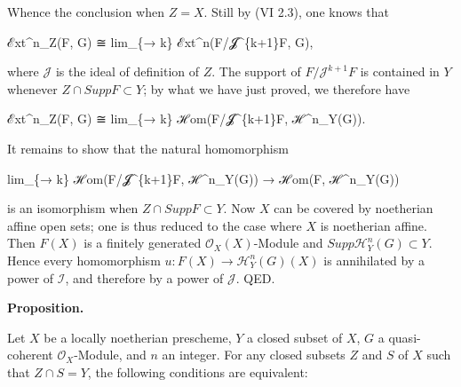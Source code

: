 \documentclass[
  11pt,
  a4paper,
]{book}
\newenvironment{Shaded}{}{}
\newcommand{\NormalTok}[1]{#1}
\begin{document}
Whence the conclusion when \(Z = X\). Still by (VI 2.3), one knows that

\begin{Shaded}
\begin{Highlighting}[]
\NormalTok{ℰxt\^{}n\_Z(F, G) ≅ lim\_\{→ k\} ℰxt\^{}n(F/𝓙\^{}\{k+1\}F, G),}
\end{Highlighting}
\end{Shaded}

where \(\mathcal{J}\) is the ideal of definition of \(Z\). The support
of \(F/\mathcal{J}^{k+1}F\) is contained in \(Y\) whenever
\(Z \cap Supp F \subset Y\); by what we have just proved, we therefore
have

\begin{Shaded}
\begin{Highlighting}[]
\NormalTok{ℰxt\^{}n\_Z(F, G) ≅ lim\_\{→ k\} ℋom(F/𝓙\^{}\{k+1\}F, ℋ\^{}n\_Y(G)).}
\end{Highlighting}
\end{Shaded}

It remains to show that the natural homomorphism

\begin{Shaded}
\begin{Highlighting}[]
\NormalTok{lim\_\{→ k\} ℋom(F/𝓙\^{}\{k+1\}F, ℋ\^{}n\_Y(G)) → ℋom(F, ℋ\^{}n\_Y(G))}
\end{Highlighting}
\end{Shaded}

is an isomorphism when \(Z \cap Supp F \subset Y\). Now \(X\) can be
covered by noetherian affine open sets; one is thus reduced to the case
where \(X\) is noetherian affine. Then \(F(X)\) is a finitely generated
\(\mathcal{O}_{X}(X)\)-Module and
\(Supp \mathcal{H}^{n}_{Y}(G) \subset Y\). Hence every homomorphism
\(u: F(X) \to \mathcal{H}^{n}_{Y}(G)(X)\) is annihilated by a power of
\(\mathcal{I}\), and therefore by a power of \(\mathcal{J}\). QED.

\textbf{Proposition.}

Let \(X\) be a locally noetherian prescheme, \(Y\) a closed subset of
\(X\), \(G\) a quasi-coherent \(\mathcal{O}_{X}\)-Module, and \(n\) an
integer. For any closed subsets \(Z\) and \(S\) of \(X\) such that
\(Z \cap S = Y\), the following conditions are equivalent:
\end{document}
